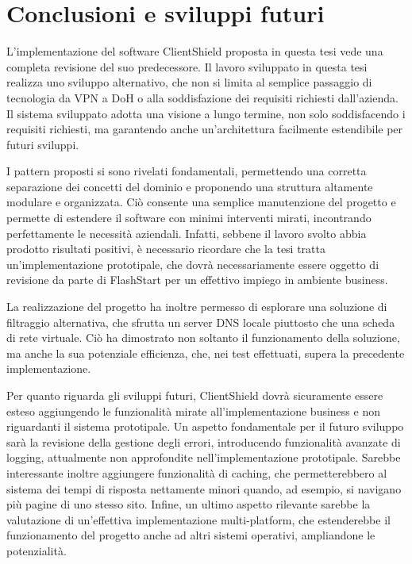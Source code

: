 \documentclass[12pt,a4paper,openright,twoside]{book}
\begin{document}
\chapter{Conclusioni e sviluppi futuri}

L'implementazione del software ClientShield proposta in questa tesi vede una completa revisione del suo predecessore.
Il lavoro sviluppato in questa tesi realizza uno sviluppo alternativo, che non si limita al semplice passaggio di tecnologia da \gls{VPN} a \gls{DoH} o alla soddisfazione dei requisiti richiesti dall'azienda.
Il sistema sviluppato adotta una visione a lungo termine, non solo soddisfacendo i requisiti richiesti, ma garantendo anche un'architettura facilmente estendibile per futuri sviluppi.

I pattern proposti si sono rivelati fondamentali, permettendo una corretta separazione dei concetti del dominio e proponendo una struttura altamente modulare e organizzata.
Ciò consente una semplice manutenzione del progetto e permette di estendere il software con minimi interventi mirati, incontrando perfettamente le necessità aziendali.
Infatti, sebbene il lavoro svolto abbia prodotto risultati positivi, è necessario ricordare che la tesi tratta un'implementazione prototipale, che dovrà necessariamente essere oggetto di revisione da parte di FlashStart per un effettivo impiego in ambiente business.

La realizzazione del progetto ha inoltre permesso di esplorare una soluzione di filtraggio alternativa, che sfrutta un server \gls{DNS} locale piuttosto che una scheda di rete virtuale.
Ciò ha dimostrato non soltanto il funzionamento della soluzione, ma anche la sua potenziale efficienza, che, nei test effettuati, supera la precedente implementazione.

Per quanto riguarda gli sviluppi futuri, ClientShield dovrà sicuramente essere esteso aggiungendo le funzionalità mirate all'implementazione business e non riguardanti il sistema prototipale.
Un aspetto fondamentale per il futuro sviluppo sarà la revisione della gestione degli errori, introducendo funzionalità avanzate di logging, attualmente non approfondite nell'implementazione prototipale.  
Sarebbe interessante inoltre aggiungere funzionalità di caching, che permetterebbero al sistema dei tempi di risposta nettamente minori quando, ad esempio, si navigano più pagine di uno stesso sito.
Infine, un ultimo aspetto rilevante sarebbe la valutazione di un'effettiva implementazione multi-platform, che estenderebbe il funzionamento del progetto anche ad altri sistemi operativi, ampliandone le potenzialità.  
\end{document}
